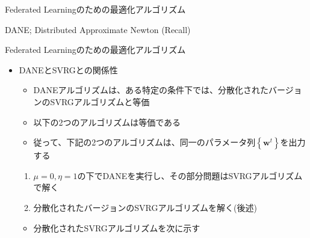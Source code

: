 \documentclass[dvipdfmx,notheorems,t]{beamer}
\begin{document}
\begin{frame}{Federated Learningのための最適化アルゴリズム}

\begin{algorithm}[H]
	\DontPrintSemicolon
	\caption{DANE; Distributed Approximate Newton (Recall) ~\cite{1610.02527}}
	\label{alg:dane-recall}
	\begin{algorithmic}[1]
		\ENDFOR
	\end{algorithmic}
\end{algorithm}

\end{frame}

\begin{frame}{Federated Learningのための最適化アルゴリズム}

\begin{itemize}
	\item DANEとSVRGとの関係性
	\begin{itemize}
		\item DANEアルゴリズムは、ある特定の条件下では、分散化されたバージョンのSVRGアルゴリズムと等価
		\newline
		
		\item 以下の2つのアルゴリズムは等価である
		\item 従って、下記の2つのアルゴリズムは、同一のパラメータ列$\left\{ \bm{w}^t \right\}$を出力する
	\end{itemize}
	
	\begin{enumerate}
		\item $\mu = 0, \eta = 1$の下でDANEを実行し、その部分問題はSVRGアルゴリズムで解く
		\item 分散化されたバージョンのSVRGアルゴリズムを解く(後述)
	\end{enumerate}
	
	\begin{itemize}
		\item 分散化されたSVRGアルゴリズムを次に示す
	\end{itemize}
\end{itemize}

\end{frame}
\end{document}
